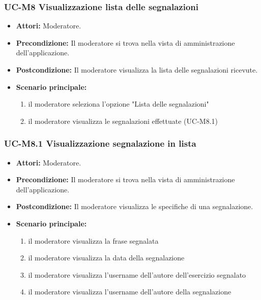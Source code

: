 \subsubsection{UC-M8 Visualizzazione lista delle segnalazioni}
\begin{itemize}
	\item \textbf{Attori:} Moderatore.
	\item \textbf{Precondizione:} Il moderatore si trova nella vista di amministrazione dell'applicazione.
	\item \textbf{Postcondizione:} Il moderatore visualizza la lista delle segnalazioni ricevute.
	\item \textbf{Scenario principale:}
	\begin{enumerate}
		\item il moderatore seleziona l'opzione "Lista delle segnalazioni"
		\item il moderatore visualizza le segnalazioni effettuate (UC-M8.1)
	\end{enumerate}
\end{itemize}

\subsubsection{UC-M8.1 Visualizzazione segnalazione in lista}
\begin{itemize}
	\item \textbf{Attori:} Moderatore.
	\item \textbf{Precondizione:} Il moderatore si trova nella vista di amministrazione dell'applicazione.
	\item \textbf{Postcondizione:} Il moderatore visualizza le specifiche di una segnalazione.
	\item \textbf{Scenario principale:}
	\begin{enumerate}
		\item il moderatore visualizza la frase segnalata
		\item il moderatore visualizza la data della segnalazione
		\item il moderatore visualizza l'username dell'autore dell'esercizio segnalato
		\item il moderatore visualizza l'username dell'autore della segnalazione
	\end{enumerate}
\end{itemize}

